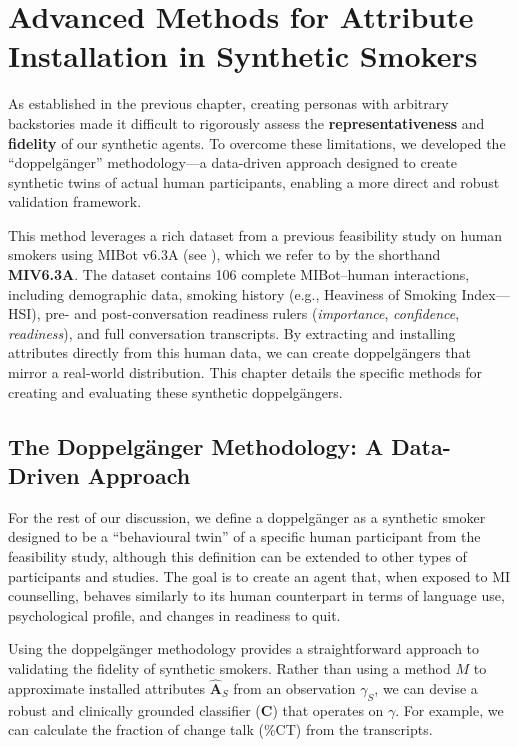 \chapter{Advanced Methods for Attribute Installation in Synthetic Smokers}
\label{ch:synthetic-doppelganger}

As established in the previous chapter, creating personas with arbitrary backstories made it difficult to rigorously assess the \textbf{representativeness} and \textbf{fidelity} of our synthetic agents. To overcome these limitations, we developed the ``doppelgänger'' methodology—a data-driven approach designed to create synthetic twins of actual human participants, enabling a more direct and robust validation framework.

This method leverages a rich dataset from a previous feasibility study on human smokers using MIBot v6.3A (see ), which we refer to by the shorthand \textbf{MIV6.3A}. The dataset contains 106 complete MIBot--human interactions, including demographic data, smoking history (e.g., Heaviness of Smoking Index---HSI), pre- and post-conversation readiness rulers (\emph{importance}, \emph{confidence}, \emph{readiness}), and full conversation transcripts. By extracting and installing attributes directly from this human data, we can create doppelgängers that mirror a real-world distribution. This chapter details the specific methods for creating and evaluating these synthetic doppelgängers.

\section{The Doppelgänger Methodology: A Data-Driven Approach}
\label{sec:synthetic-smoker-doppelgänger}

For the rest of our discussion, we define a doppelgänger as a synthetic smoker designed to be a ``behavioural twin'' of a specific human participant from the feasibility study, although this definition can be extended to other types of participants and studies. The goal is to create an agent that, when exposed to MI counselling, behaves similarly to its human counterpart in terms of language use, psychological profile, and changes in readiness to quit.

Using the doppelgänger methodology provides a straightforward approach to validating the fidelity of synthetic smokers. Rather than using a method $M$ to approximate installed attributes $\hat{\textbf{A}}_S$ from an observation $\gamma_S$, we can devise a robust and clinically grounded classifier ($\textbf{C}$) that operates on $\gamma$. For example, we can calculate the fraction of change talk (\%CT) from the transcripts.

